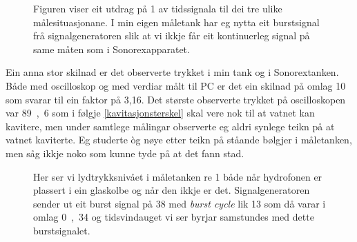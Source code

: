 \begin{figure}[htbp]
	\begin{center}
	\end{center}
	\caption[Tidssignala til dei ulike målingane]{Figuren viser eit utdrag på \unit{1}{\milli\second} av tidssignala til dei tre ulike målesituasjonane. I min eigen måletank har eg nytta eit burstsignal frå signalgeneratoren slik at vi ikkje får eit kontinuerleg signal på same måten som i Sonorexapparatet.}
	\label{fig:tidssignal}
\end{figure}

Ein anna stor skilnad er det observerte trykket i min tank og i Sonorextanken. Både med oscilloskop og med verdiar målt til PC er det ein skilnad på omlag \unit{10}{\deci\bel} som svarar til ein faktor på 3,16. Det største observerte trykket på oscilloskopen var \unit{89,6}{\kilo\pascal} som i følgje \eqref{kavitasjonsterskel} skal vere nok til at vatnet kan kavitere, men under samtlege målingar observerte eg aldri synlege teikn på at vatnet kaviterte. Eg studerte òg nøye etter teikn på ståande bølgjer i måletanken, men såg ikkje noko som kunne tyde på at det fann stad.

\begin{figure}[htbp]
	\centering
	\caption[Lydtrykksnivå i måletanken]{Her ser vi lydtrykksnivået i måletanken re \unit{1}{\micro\pascal} både når hydrofonen er plassert i ein glaskolbe og når den ikkje er det. Signalgeneratoren sender ut eit burst signal på \unit{38}{\kilo\hertz} med \emph{burst cycle} lik 13 som då varar i omlag \unit{0,34}{\milli\second} og tidsvindauget vi ser byrjar samstundes med dette burstsignalet.}
	\label{fig:trykk}
\end{figure}

